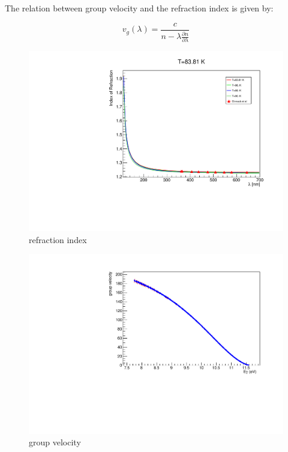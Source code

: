 \documentclass[a4paper]{jpconf}
\begin{document}
 The relation between group velocity and the refraction index is given by:

\begin{equation}
  v_g (\lambda)= \frac{c}{n-\lambda \frac{\partial{n}}{\partial{\lambda}}}
      \label{equ:vgroup}
\end{equation}

 


\begin{figure}[ht]
\begin{center}
\includegraphics[width=35.5pc]{sellmeier.pdf}
\end{center}
\caption{\label{fig:sellmeier}refraction index}
\end{figure}
\begin{figure}[ht]
\begin{center}
\includegraphics[width=35.5pc]{vg.pdf}
\end{center}
\caption{\label{fig:vg}group velocity}
\end{figure}
\end{document}
